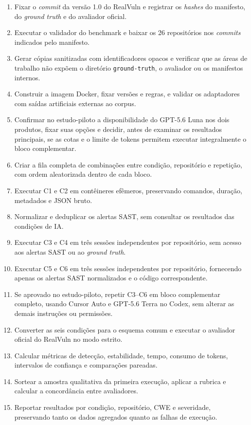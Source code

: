 \begin{enumerate}
\item Fixar o \textit{commit} da versão 1.0 do RealVuln e registrar os \textit{hashes} do manifesto, do \textit{ground truth} e do avaliador oficial.
\item Executar o validador do benchmark e baixar os 26 repositórios nos \textit{commits} indicados pelo manifesto.
\item Gerar cópias sanitizadas com identificadores opacos e verificar que as áreas de trabalho não expõem o diretório \texttt{ground-truth}, o avaliador ou os manifestos internos.
\item Construir a imagem Docker, fixar versões e regras, e validar os adaptadores com saídas artificiais externas ao corpus.
\item Confirmar no estudo-piloto a disponibilidade do GPT-5.6 Luna nos dois produtos, fixar suas opções e decidir, antes de examinar os resultados principais, se as cotas e o limite de tokens permitem executar integralmente o bloco complementar.
\item Criar a fila completa de combinações entre condição, repositório e repetição, com ordem aleatorizada dentro de cada bloco.
\item Executar C1 e C2 em contêineres efêmeros, preservando comandos, duração, metadados e JSON bruto.
\item Normalizar e deduplicar os alertas SAST, sem consultar os resultados das condições de IA.
\item Executar C3 e C4 em três sessões independentes por repositório, sem acesso aos alertas SAST ou ao \textit{ground truth}.
\item Executar C5 e C6 em três sessões independentes por repositório, fornecendo apenas os alertas SAST normalizados e o código correspondente.
\item Se aprovado no estudo-piloto, repetir C3--C6 em bloco complementar completo, usando Cursor Auto e GPT-5.6 Terra no Codex, sem alterar as demais instruções ou permissões.
\item Converter as seis condições para o esquema comum e executar o avaliador oficial do RealVuln no modo estrito.
\item Calcular métricas de detecção, estabilidade, tempo, consumo de tokens, intervalos de confiança e comparações pareadas.
\item Sortear a amostra qualitativa da primeira execução, aplicar a rubrica e calcular a concordância entre avaliadores.
\item Reportar resultados por condição, repositório, CWE e severidade, preservando tanto os dados agregados quanto as falhas de execução.
\end{enumerate}

